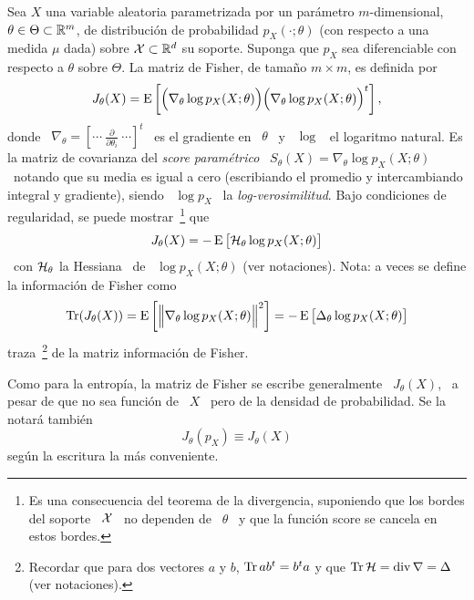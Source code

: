 \begin{definicion}
\label{Def:SZ:MatrizFisherParametrica}
%
  Sea   $X$   una   variable   aleatoria  parametrizada   por   un   par\'ametro
  $m$-dimensional,  $\theta \in  \Theta \subset  \mathbb{R}^m$, de  distribuci\'on de
  probabilidad $p_X(\cdot;\theta)$ (con respecto a  una medida $\mu$ dada) sobre
  $\mathcal{X}  \subset \mathbb{R}^d$  su soporte.   Suponga que  $p_X$ sea  diferenciable con
  respecto  a  $\theta$  sobre  $\Theta$.   La matriz  de  Fisher,  de  tama\~no
  $m \times m$, es definida por
  \[
  J_\theta(X)  =  \operatorname{E}\left[  \Big(  \nabla_\theta \log  p_X(X;\theta)  \Big)
    \Big( \nabla_\theta \log p_X(X;\theta) \Big)^t \right],
  \]
  donde \  $\nabla_\theta = \left[ \cdots  \: \frac{\partial}{\partial \theta_i}
    \: \cdots  \right]^t$ \  es el gradiente  en \  $\theta$ \ y  \ $\log$  \ el
  logaritmo natural.  Es la matriz de covarianza del {\it score param\'etrico} \
  $S_\theta(X) =  \nabla_\theta \log  p_X(X;\theta)$ \ notando  que su  media es
  igual a cero (escribiando el  promedio y intercambiando integral y gradiente),
  siendo  \  $\log p_X$  \  la  {\it  log-verosimilitud}.  Bajo  condiciones  de
  regularidad, se puede mostrar~\footnote{Es  una consecuencia del teorema de la
    divergencia, suponiendo que los bordes del soporte \ $\mathcal{X}$ \ no dependen de \
    $\theta$ \  y que  la funci\'on score  se cancela  en estos bordes.}   que
    \[
    J_\theta(X) =  - \operatorname{E}\big[ \mathcal{H}_\theta \log p_X(X;\theta) \big]
    \]
    \ con $\mathcal{H}_\theta$  la  Hessiana
  \ de  \ $\log  p_X(X;\theta)$ (ver  notaciones).  Nota: a  veces se  define la
  informaci\'on de  Fisher como
  \[
  \operatorname{Tr}(J_\theta(X))    =     \operatorname{E}\left[    \Big\|     \nabla_\theta    \log
  p_X(X;\theta)   \Big\|^2   \right]   =   -   \operatorname{E}\big[   \Delta_\theta   \log
  p_X(X;\theta) \big] \]
  traza~\footnote{Recordar que para dos vectores $a$ y  $b$, $\operatorname{Tr} a b^t = b^t a$
  y que  $\operatorname{Tr} \mathcal{H}  = \operatorname{div}  \nabla =  \Delta$ (ver  notaciones).} de  la matriz
  informaci\'on de Fisher.
\end{definicion}
%
Como  para  la  entrop\'ia,  la  matriz  de Fisher  se  escribe  generalmente  \
$J_\theta(X)$, \ a pesar de que no sea  funci\'on de \ $X$ \ pero de la densidad
de  probabilidad.  Se  la  notar\'a  tambi\'en
%
\[
J_\theta(p_X) \equiv J_\theta(X)
\]
%
seg\'un la escritura la m\'as conveniente.

